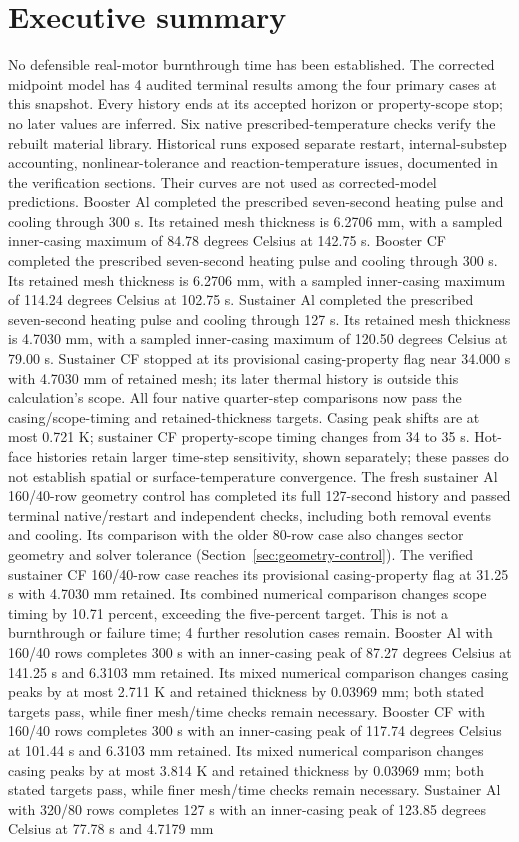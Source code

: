 \documentclass[oneside,openany]{amsdtx}
\begin{document}
\section{Executive summary}
No defensible real-motor burnthrough time has been established. The corrected midpoint model has 4 audited terminal results among the four primary cases at this snapshot. Every history ends at its accepted horizon or property-scope stop; no later values are inferred. Six native prescribed-temperature checks verify the rebuilt material library. Historical runs exposed separate restart, internal-substep accounting, nonlinear-tolerance and reaction-temperature issues, documented in the verification sections. Their curves are not used as corrected-model predictions. Booster Al completed the prescribed seven-second heating pulse and cooling through 300 s. Its retained mesh thickness is 6.2706 mm, with a sampled inner-casing maximum of 84.78 degrees Celsius at 142.75 s. Booster CF completed the prescribed seven-second heating pulse and cooling through 300 s. Its retained mesh thickness is 6.2706 mm, with a sampled inner-casing maximum of 114.24 degrees Celsius at 102.75 s. Sustainer Al completed the prescribed seven-second heating pulse and cooling through 127 s. Its retained mesh thickness is 4.7030 mm, with a sampled inner-casing maximum of 120.50 degrees Celsius at 79.00 s. Sustainer CF stopped at its provisional casing-property flag near 34.000 s with 4.7030 mm of retained mesh; its later thermal history is outside this calculation's scope. All four native quarter-step comparisons now pass the casing/scope-timing and retained-thickness targets. Casing peak shifts are at most 0.721 K; sustainer CF property-scope timing changes from 34 to 35 s. Hot-face histories retain larger time-step sensitivity, shown separately; these passes do not establish spatial or surface-temperature convergence. The fresh sustainer Al 160/40-row geometry control has completed its full 127-second history and passed terminal native/restart and independent checks, including both removal events and cooling. Its comparison with the older 80-row case also changes sector geometry and solver tolerance (Section~\ref{sec:geometry-control}). The verified sustainer CF 160/40-row case reaches its provisional casing-property flag at 31.25 s with 4.7030 mm retained. Its combined numerical comparison changes scope timing by 10.71 percent, exceeding the five-percent target. This is not a burnthrough or failure time; 4 further resolution cases remain. Booster Al with 160/40 rows completes 300 s with an inner-casing peak of 87.27 degrees Celsius at 141.25 s and 6.3103 mm retained. Its mixed numerical comparison changes casing peaks by at most 2.711 K and retained thickness by 0.03969 mm; both stated targets pass, while finer mesh/time checks remain necessary. Booster CF with 160/40 rows completes 300 s with an inner-casing peak of 117.74 degrees Celsius at 101.44 s and 6.3103 mm retained. Its mixed numerical comparison changes casing peaks by at most 3.814 K and retained thickness by 0.03969 mm; both stated targets pass, while finer mesh/time checks remain necessary. Sustainer Al with 320/80 rows completes 127 s with an inner-casing peak of 123.85 degrees Celsius at 77.78 s and 4.7179 mm 
\end{document}
